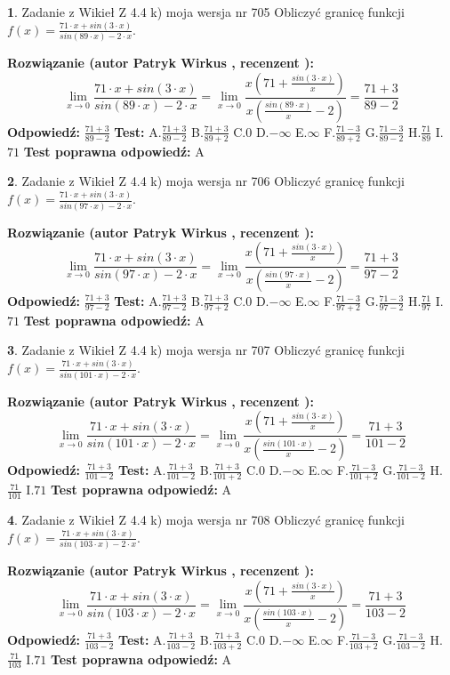 \documentclass[12pt, a4paper]{article}
\theoremstyle{definition} %
\newtheorem{zad}{}
\newcommand{\zadStart}[1]{\begin{zad}#1\newline}
\newcommand{\zadStop}{\end{zad}}
\newcommand{\rozwStart}[2]{\noindent \textbf{Rozwiązanie (autor #1 , recenzent #2): }\newline}
\newcommand{\rozwStop}{\newline}
\newcommand{\odpStart}{\noindent \textbf{Odpowiedź:}\newline}
\newcommand{\odpStop}{\newline}
\newcommand{\testStart}{\noindent \textbf{Test:}\newline}
\newcommand{\testStop}{\newline}
\newcommand{\kluczStart}{\noindent \textbf{Test poprawna odpowiedź:}\newline}
\newcommand{\kluczStop}{\newline}
\begin{document}
\zadStart{Zadanie z Wikieł Z 4.4 k) moja wersja nr 705}
Obliczyć granicę funkcji $f(x)=\frac{71\cdot x +sin(3\cdot x)}{sin(89\cdot x) -2\cdot x}$.
\zadStop
\rozwStart{Patryk Wirkus}{}
$$\lim\limits_{x\to 0}\frac{71\cdot x +sin(3\cdot x)}{sin(89\cdot x) -2\cdot x}
=\lim\limits_{x\to 0}\frac{x(71+\frac{sin(3\cdot x)}{x})}{x(\frac{sin(89\cdot x)}{x}-2)}
=\frac{71+3}{89-2}$$
\rozwStop
\odpStart
$\frac{71+3}{89-2}$
\odpStop
\testStart
A.$\frac{71+3}{89-2}$
B.$\frac{71+3}{89+2}$
C.$0$
D.$-\infty$
E.$\infty$
F.$\frac{71-3}{89+2}$
G.$\frac{71-3}{89-2}$
H.$\frac{71}{89}$
I.$71$
\testStop
\kluczStart
A
\kluczStop



\zadStart{Zadanie z Wikieł Z 4.4 k) moja wersja nr 706}
Obliczyć granicę funkcji $f(x)=\frac{71\cdot x +sin(3\cdot x)}{sin(97\cdot x) -2\cdot x}$.
\zadStop
\rozwStart{Patryk Wirkus}{}
$$\lim\limits_{x\to 0}\frac{71\cdot x +sin(3\cdot x)}{sin(97\cdot x) -2\cdot x}
=\lim\limits_{x\to 0}\frac{x(71+\frac{sin(3\cdot x)}{x})}{x(\frac{sin(97\cdot x)}{x}-2)}
=\frac{71+3}{97-2}$$
\rozwStop
\odpStart
$\frac{71+3}{97-2}$
\odpStop
\testStart
A.$\frac{71+3}{97-2}$
B.$\frac{71+3}{97+2}$
C.$0$
D.$-\infty$
E.$\infty$
F.$\frac{71-3}{97+2}$
G.$\frac{71-3}{97-2}$
H.$\frac{71}{97}$
I.$71$
\testStop
\kluczStart
A
\kluczStop



\zadStart{Zadanie z Wikieł Z 4.4 k) moja wersja nr 707}
Obliczyć granicę funkcji $f(x)=\frac{71\cdot x +sin(3\cdot x)}{sin(101\cdot x) -2\cdot x}$.
\zadStop
\rozwStart{Patryk Wirkus}{}
$$\lim\limits_{x\to 0}\frac{71\cdot x +sin(3\cdot x)}{sin(101\cdot x) -2\cdot x}
=\lim\limits_{x\to 0}\frac{x(71+\frac{sin(3\cdot x)}{x})}{x(\frac{sin(101\cdot x)}{x}-2)}
=\frac{71+3}{101-2}$$
\rozwStop
\odpStart
$\frac{71+3}{101-2}$
\odpStop
\testStart
A.$\frac{71+3}{101-2}$
B.$\frac{71+3}{101+2}$
C.$0$
D.$-\infty$
E.$\infty$
F.$\frac{71-3}{101+2}$
G.$\frac{71-3}{101-2}$
H.$\frac{71}{101}$
I.$71$
\testStop
\kluczStart
A
\kluczStop



\zadStart{Zadanie z Wikieł Z 4.4 k) moja wersja nr 708}
Obliczyć granicę funkcji $f(x)=\frac{71\cdot x +sin(3\cdot x)}{sin(103\cdot x) -2\cdot x}$.
\zadStop
\rozwStart{Patryk Wirkus}{}
$$\lim\limits_{x\to 0}\frac{71\cdot x +sin(3\cdot x)}{sin(103\cdot x) -2\cdot x}
=\lim\limits_{x\to 0}\frac{x(71+\frac{sin(3\cdot x)}{x})}{x(\frac{sin(103\cdot x)}{x}-2)}
=\frac{71+3}{103-2}$$
\rozwStop
\odpStart
$\frac{71+3}{103-2}$
\odpStop
\testStart
A.$\frac{71+3}{103-2}$
B.$\frac{71+3}{103+2}$
C.$0$
D.$-\infty$
E.$\infty$
F.$\frac{71-3}{103+2}$
G.$\frac{71-3}{103-2}$
H.$\frac{71}{103}$
I.$71$
\testStop
\kluczStart
A
\kluczStop
\end{document}
